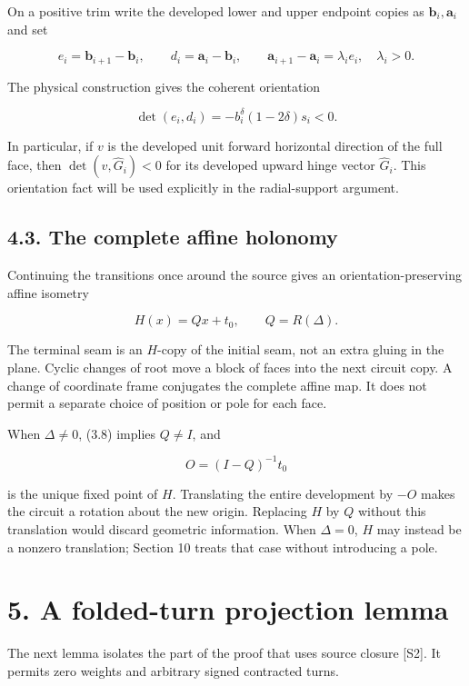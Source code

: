 \documentclass[
  11pt,
  letterpaper,
]{article}
\begin{document}
On a positive trim write the developed lower and upper endpoint copies
as \(\mathbf b_i,\mathbf a_i\) and set

\[
e_i=\mathbf b_{i+1}-\mathbf b_i,\qquad
d_i=\mathbf a_i-\mathbf b_i,\qquad
\mathbf a_{i+1}-\mathbf a_i=\lambda_i e_i,
\quad\lambda_i>0.
\]

The physical construction gives the coherent orientation

\[
\det(e_i,d_i)=-b_i^{\delta}(1-2\delta)s_i<0.
\tag{4.3}
\]

In particular, if \(v\) is the developed unit forward horizontal
direction of the full face, then \(\det(v,\widehat G_i)<0\) for its
developed upward hinge vector \(\widehat G_i\). This orientation fact
will be used explicitly in the radial-support argument.

\subsection{4.3. The complete affine
holonomy}\label{the-complete-affine-holonomy}

Continuing the transitions once around the source gives an
orientation-preserving affine isometry

\[
H(x)=Qx+t_0,\qquad Q=R(\Delta).
\tag{4.4}
\]

The terminal seam is an \(H\)-copy of the initial seam, not an extra
gluing in the plane. Cyclic changes of root move a block of faces into
the next circuit copy. A change of coordinate frame conjugates the
complete affine map. It does not permit a separate choice of position or
pole for each face.

When \(\Delta\ne0\), (3.8) implies \(Q\ne I\), and

\[
O=(I-Q)^{-1}t_0
\tag{4.5}
\]

is the unique fixed point of \(H\). Translating the entire development
by \(-O\) makes the circuit a rotation about the new origin. Replacing
\(H\) by \(Q\) without this translation would discard geometric
information. When \(\Delta=0\), \(H\) may instead be a nonzero
translation; Section 10 treats that case without introducing a pole.

\section{5. A folded-turn projection
lemma}\label{a-folded-turn-projection-lemma}

The next lemma isolates the part of the proof that uses source closure
{[}S2{]}. It permits zero weights and arbitrary signed contracted turns.
\end{document}
